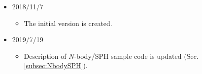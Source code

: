 \begin{itemize}
\item 2018/11/7
  \begin{itemize}
  \item The initial version is created.
  \end{itemize}
\item 2019/7/19
  \begin{itemize}
  \item Description of $N$-body/SPH sample code is updated (Sec. \ref{subsec:NbodySPH}).
  \end{itemize}
\end{itemize}
